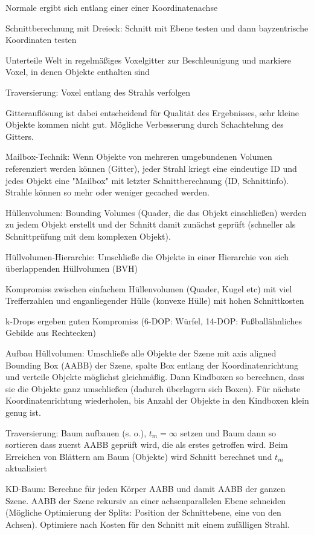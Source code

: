 \documentclass[12pt,landscape]{article}
\begin{document}
\begin{multicols}{3}
\begin{compactitem}
\item Normale ergibt sich entlang einer einer Koordinatenachse
\item Schnittberechnung mit Dreieck: Schnitt mit Ebene testen und dann bayzentrische Koordinaten testen
\item Unterteile Welt in regelmäßiges Voxelgitter zur Beschleunigung und markiere Voxel, in denen Objekte enthalten sind
\item Traversierung: Voxel entlang des Strahls verfolgen
\item Gitterauflösung ist dabei entscheidend für Qualität des Ergebnisses, sehr kleine Objekte kommen nicht gut. Mögliche Verbesserung durch Schachtelung des Gitters.
\item Mailbox-Technik: Wenn Objekte von mehreren umgebundenen Volumen referenziert werden können (Gitter), jeder Strahl kriegt eine eindeutige ID und jedes Objekt eine "Mailbox" mit letzter Schnittberechnung (ID, Schnittinfo). Strahle können so mehr oder weniger gecached werden.
\item Hüllenvolumen: Bounding Volumes (Quader, die das Objekt einschließen) werden zu jedem Objekt erstellt und der Schnitt damit zunächst geprüft (schneller als Schnittprüfung mit dem komplexen Objekt).
\item Hüllvolumen-Hierarchie: Umschließe die Objekte in einer Hierarchie von sich überlappenden Hüllvolumen (BVH)
\item Kompromiss zwischen einfachem Hüllenvolumen (Quader, Kugel etc) mit viel Trefferzahlen und enganliegender Hülle (konvexe Hülle) mit hohen Schnittkosten
\item k-Drops ergeben guten Kompromiss (6-DOP: Würfel, 14-DOP: Fußballähnliches Gebilde aus Rechtecken)
\item Aufbau Hüllvolumen: Umschließe alle Objekte der Szene mit axis aligned Bounding Box (AABB) der Szene, spalte Box entlang der Koordinatenrichtung und verteile Objekte möglichst gleichmäßig. Dann Kindboxen so berechnen, dass sie die Objekte ganz umschließen (dadurch überlagern sich Boxen). Für nächste Koordinatenrichtung wiederholen, bis Anzahl der Objekte in den Kindboxen klein genug ist.
\item Traversierung: Baum aufbauen (s. o.), $t_m = \infty$ setzen und Baum dann so sortieren dass zuerst AABB geprüft wird, die als erstes getroffen wird. Beim Erreichen von Blättern am Baum (Objekte) wird Schnitt berechnet und $t_m$ aktualisiert
\item KD-Baum: Berechne für jeden Körper AABB und damit AABB der ganzen Szene. AABB der Szene rekursiv an einer achsenparallelen Ebene schneiden (Mögliche Optimierung der Splits: Position der Schnittebene, eine von den Achsen). Optimiere nach Kosten für den Schnitt mit einem zufälligen Strahl.

\end{compactitem}
\end{multicols}
\end{document}
